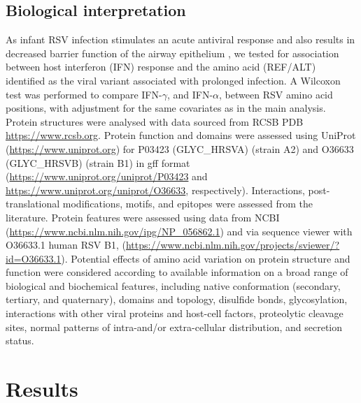 \documentclass{article} %
\begin{document}
\subsection{Biological interpretation}
As infant RSV infection stimulates an acute antiviral response and also results in decreased barrier function of the airway epithelium \citep{connelly2021metabolic}, we tested for association between host interferon (IFN) response and the amino acid (REF/ALT) identified as the viral variant associated with prolonged infection. 
A Wilcoxon test was performed to compare  IFN-$\gamma$, and IFN-$\alpha$, between RSV amino acid positions, with adjustment for the same covariates as in the main analysis. 
Protein structures were analysed with data sourced from RCSB PDB \url{https://www.rcsb.org}. 
Protein function and domains were assessed using UniProt	(\url{https://www.uniprot.org}) for P03423 (GLYC\_HRSVA) (strain A2) and O36633 (GLYC\_HRSVB) (strain B1) in gff format (\url{https://www.uniprot.org/uniprot/P03423} and
\url{https://www.uniprot.org/uniprot/O36633}, respectively). 
Interactions, post-translational modifications, motifs, and epitopes were assessed from the literature. 
Protein features were assessed using data from NCBI (\url{https://www.ncbi.nlm.nih.gov/ipg/NP_056862.1}) and via sequence viewer with O36633.1 human RSV B1, 
(\url{https://www.ncbi.nlm.nih.gov/projects/sviewer/?id=O36633.1}). 
Potential effects of amino acid variation on protein structure and function were considered according to available information on a broad range of biological and biochemical features, including native conformation (secondary, tertiary, and quaternary), domains and topology, disulfide bonds, glycosylation, interactions with other viral proteins and host-cell factors, proteolytic cleavage sites, normal patterns of intra-and/or extra-cellular distribution, and secretion status.

\section{Results}
\end{document}
